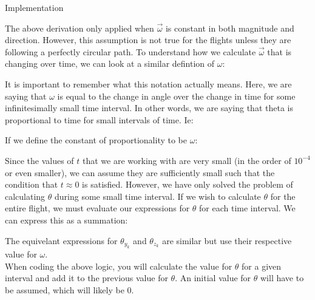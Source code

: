 \documentclass[12pt, letterpaper]{article}
\begin{document}
\begin{center}
Implementation
\end{center}
The above derivation only applied when $\vec{\omega}$ is constant in both magnitude and direction. However, this assumption is not true for the flights unless they are following a perfectly circular path. To understand how we calculate $\vec{\omega}$ that is changing over time, we can look at a similar defintion of $\omega$:
\begin{center}
\end{center}
It is important to remember what this notation actually means. Here, we are saying that $\omega$ is equal to the change in angle over the change in time for some infinitesimally small time interval. In other words, we are saying that theta is proportional to time for small intervals of time. Ie:
\begin{center}
\scalebox{1.25}{$\theta \propto t$, if $t \approx 0$}
\end{center}
If we define the constant of proportionality to be $\omega$:
\begin{center}
\scalebox{1.25}{$\theta = \omega t$, if $t \approx 0$}
\end{center}
Since the values of $t$ that we are working with are very small (in the order of $10^{-4}$ or even smaller), we can assume they are sufficiently small such that the condition that $t \approx 0$ is satisfied. However, we have only solved the problem of calculating $\theta$ during some small time interval. If we wish to calculate $\theta$ for the entire flight, we must evaluate our expressions for $\theta$ for each time interval. We can express this as a summation:
\begin{center}
\end{center}
The equivelant expressions for $\theta _{y_{k}}$ and $\theta _{z_{k}}$ are similar but use their respective value for $\omega$.
\bigskip
\\When coding the above logic, you will calculate the value for $\theta$ for a given interval and add it to the previous value for $\theta$. An initial value for $\theta$ will have to be assumed, which will likely be $0$.
\end{document}
